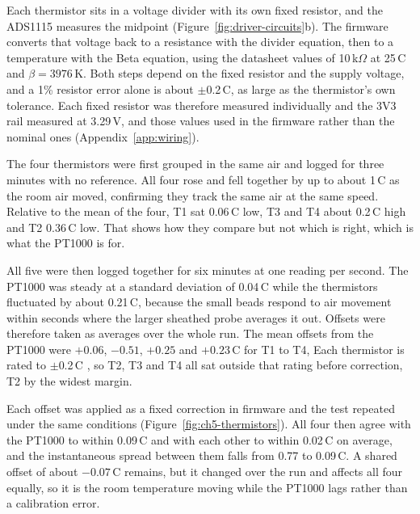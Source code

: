 Each thermistor sits in a voltage divider with its own fixed resistor, and the ADS1115 measures the midpoint (Figure~\ref{fig:driver-circuits}b). The firmware converts that voltage back to a resistance with the divider equation, then to a temperature with the Beta equation, using the datasheet values of 10\,k$\Omega$ at 25\,\textdegree{}C and $\beta = 3976$\,K. Both steps depend on the fixed resistor and the supply voltage, and a 1\% resistor error alone is about $\pm$0.2\,\textdegree{}C, as large as the thermistor's own tolerance. Each fixed resistor was therefore measured individually and the 3V3 rail measured at 3.29\,V, and those values used in the firmware rather than the nominal ones (Appendix~\ref{app:wiring}).

The four thermistors were first grouped in the same air and logged for three minutes with no reference. All four rose and fell together by up to about 1\,\textdegree{}C as the room air moved, confirming they track the same air at the same speed. Relative to the mean of the four, T1 sat 0.06\,\textdegree{}C low, T3 and T4 about 0.2\,\textdegree{}C high and T2 0.36\,\textdegree{}C low. That shows how they compare but not which is right, which is what the PT1000 is for.

All five were then logged together for six minutes at one reading per second. The PT1000 was steady at a standard deviation of 0.04\,\textdegree{}C while the thermistors fluctuated by about 0.21\,\textdegree{}C, because the small beads respond to air movement within seconds where the larger sheathed probe averages it out. Offsets were therefore taken as averages over the whole run. The mean offsets from the PT1000 were $+0.06$, $-0.51$, $+0.25$ and $+0.23$\,\textdegree{}C for T1 to T4, Each thermistor is rated to $\pm$0.2\,\textdegree{}C \citep{te_ga10k_2019}, so T2, T3 and T4 all sat outside that rating before correction, T2 by the widest margin.

Each offset was applied as a fixed correction in firmware and the test repeated under the same conditions (Figure~\ref{fig:ch5-thermistors}). All four then agree with the PT1000 to within 0.09\,\textdegree{}C and with each other to within 0.02\,\textdegree{}C on average, and the instantaneous spread between them falls from 0.77 to 0.09\,\textdegree{}C. A shared offset of about $-0.07$\,\textdegree{}C remains, but it changed over the run and affects all four equally, so it is the room temperature moving while the PT1000 lags rather than a calibration error.

